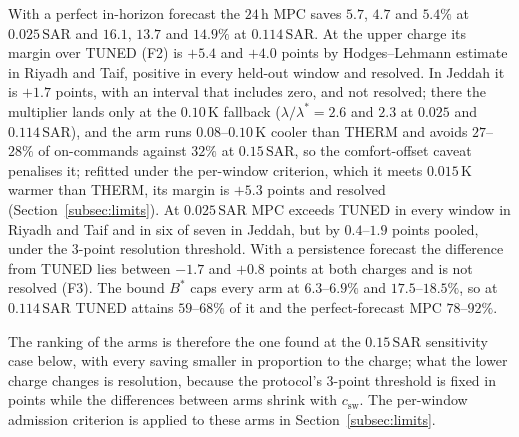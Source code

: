 \documentclass[pdflatex,sn-mathphys-num,iicol]{sn-jnl}
\theoremstyle{thmstyleone}\newtheorem{proposition}{Proposition}\newtheorem{corollary}{Corollary}
\theoremstyle{thmstyletwo}\newtheorem{remark}{Remark}\newtheorem{observation}{Observation}
\theoremstyle{thmstylethree}\newtheorem{definition}{Definition}
\newcommand{\csw}{c_{\mathrm{sw}}}
\newcommand{\SAR}{\text{SAR}}
\begin{document}
With a perfect in-horizon forecast the $24\,$h MPC saves $5.7$, $4.7$ and $5.4\%$ at $0.025\,\SAR$ and $16.1$, $13.7$ and $14.9\%$ at $0.114\,\SAR$. At the upper charge its margin over TUNED (F2) is $+5.4$ and $+4.0$ points by Hodges--Lehmann estimate in Riyadh and Taif, positive in every held-out window and resolved. In Jeddah it is $+1.7$ points, with an interval that includes zero, and not resolved; there the multiplier lands only at the $0.10\,$K fallback ($\lambda/\lambda^\ast=2.6$ and $2.3$ at $0.025$ and $0.114\,\SAR$), and the arm runs $0.08$--$0.10\,$K cooler than THERM and avoids $27$--$28\%$ of on-commands against $32\%$ at $0.15\,\SAR$, so the comfort-offset caveat penalises it; refitted under the per-window criterion, which it meets $0.015\,$K warmer than THERM, its margin is $+5.3$ points and resolved (Section~\ref{subsec:limits}). At $0.025\,\SAR$ MPC exceeds TUNED in every window in Riyadh and Taif and in six of seven in Jeddah, but by $0.4$--$1.9$ points pooled, under the $3$-point resolution threshold. With a persistence forecast the difference from TUNED lies between $-1.7$ and $+0.8$ points at both charges and is not resolved (F3). The bound $B^\ast$ caps every arm at $6.3$--$6.9\%$ and $17.5$--$18.5\%$, so at $0.114\,\SAR$ TUNED attains $59$--$68\%$ of it and the perfect-forecast MPC $78$--$92\%$.

The ranking of the arms is therefore the one found at the $0.15\,\SAR$ sensitivity case below, with every saving smaller in proportion to the charge; what the lower charge changes is resolution, because the protocol's $3$-point threshold is fixed in points while the differences between arms shrink with $\csw$. The per-window admission criterion is applied to these arms in Section~\ref{subsec:limits}.
\end{document}
